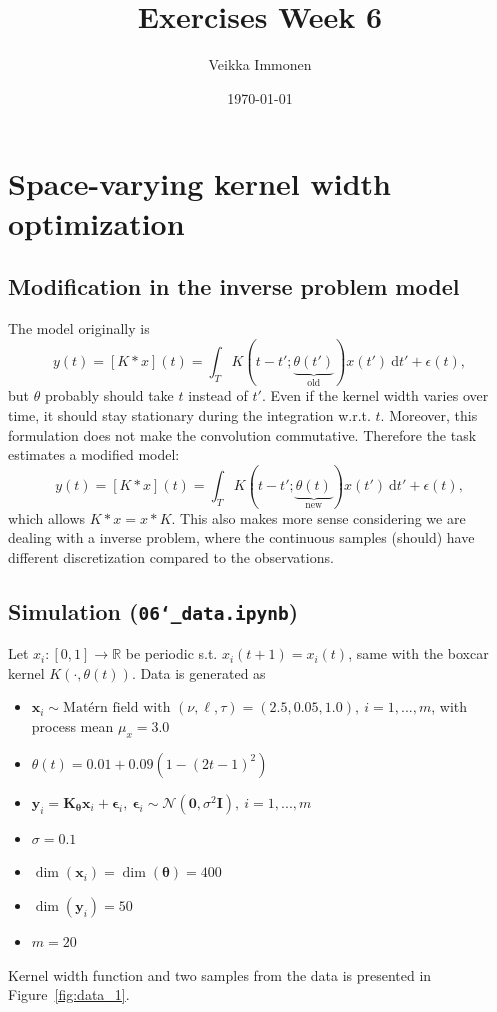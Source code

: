 \documentclass[times, a4paper, 12pt, onecolumn, oneside]{article}
\date{}
\title{ Exercises Week 6}
\author{Veikka Immonen}
\date{\today}
\newcommand{\bm}{\boldsymbol}
\begin{document}
\maketitle

\section{Space-varying kernel width optimization}

\subsection{Modification in the inverse problem model}

The model originally is
$$
y(t) = [K * x](t) = \int_T K(t-t'; \underbrace{\theta(t')}_{\text{old}})x(t')~\text{d}t' + \epsilon(t),
$$
but $\theta$ probably should take $t$ instead of $t'$. Even if the kernel width varies over time,
it should stay stationary during the integration w.r.t. $t$. Moreover, this formulation does not make the
convolution commutative. Therefore the task estimates a modified model:
$$
y(t) = [K * x](t) = \int_T K(t-t'; \underbrace{\theta(t)}_{\text{new}})x(t')~\text{d}t' + \epsilon(t),
$$
which allows $K*x = x*K$. This also makes more sense considering we are dealing with a inverse problem, where the continuous samples
(should) have different discretization compared to the observations.

\subsection{Simulation (\texttt{06\char`_data.ipynb})}

Let $x_i: [0, 1] \rightarrow \mathbb{R}$ be periodic s.t. $x_i(t+1) = x_i(t)$, same with the boxcar kernel $K(\cdot, \theta(t))$.
Data is generated as
\begin{itemize}
\item $\bm{x}_i \sim \text{Matérn field with } (\nu, \ell, \tau) = (2.5, 0.05, 1.0), ~ i=1,...,m$, with process mean $\mu_{x} = 3.0$
\item $\theta(t) = 0.01 + 0.09\left(1-\left(2t-1\right)^{2}\right)$
\item $\bm{y}_i = \bm{K}_{\bm{\theta}} \bm{x}_i + \bm{\epsilon}_i, ~ \bm{\epsilon}_i \sim \mathcal{N}(\bm{0}, \sigma^2\bm{I}), ~ i = 1,...,m$
\item $\sigma = 0.1$
\item $\dim(\bm{x}_i) = \dim(\bm{\theta}) = 400$
\item $\dim(\bm{y}_i) = 50$
\item $m=20$ 
\end{itemize}
Kernel width function and two samples from the data is presented in Figure~\ref{fig:data_1}.
\end{document}
